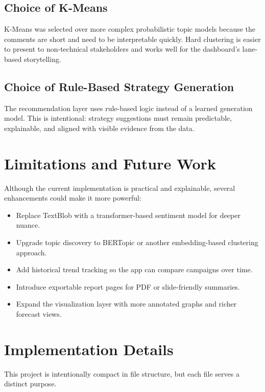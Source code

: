\subsection{Choice of K-Means}
K-Means was selected over more complex probabilistic topic models because the comments are short and need to be interpretable quickly. Hard clustering is easier to present to non-technical stakeholders and works well for the dashboard's lane-based storytelling.

\subsection{Choice of Rule-Based Strategy Generation}
The recommendation layer uses rule-based logic instead of a learned generation model. This is intentional: strategy suggestions must remain predictable, explainable, and aligned with visible evidence from the data.

\section{Limitations and Future Work}
Although the current implementation is practical and explainable, several enhancements could make it more powerful:
\begin{itemize}
    \item Replace TextBlob with a transformer-based sentiment model for deeper nuance.
    \item Upgrade topic discovery to BERTopic or another embedding-based clustering approach.
    \item Add historical trend tracking so the app can compare campaigns over time.
    \item Introduce exportable report pages for PDF or slide-friendly summaries.
    \item Expand the visualization layer with more annotated graphs and richer forecast views.
\end{itemize}

\section{Implementation Details}
This project is intentionally compact in file structure, but each file serves a distinct purpose.

